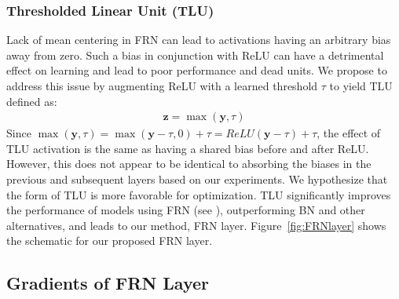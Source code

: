 \documentclass[10pt,twocolumn,letterpaper]{article}
\newcommand{\orelu}{TLU}
\newcommand{\relu}{ReLU}
\newcommand{\papername}{FRN}
\newcommand{\batchnorm}{BN}
\newcommand{\momentnorm}{FRN}
\begin{document}
\subsubsection{Thresholded Linear Unit (\orelu{})}
\label{sec:offsetrelu}

Lack of mean centering in FRN can lead to activations having an arbitrary bias away from zero. Such a bias in conjunction with ReLU can have a detrimental effect on learning and lead to poor performance and dead units. We propose to address this issue by augmenting ReLU with a learned threshold $\tau$ to yield \orelu{} defined as:
\begin{align}
\label{eq:offsetrelu}
\bm{z} = \max(\bm{y}, \tau)
\end{align}
Since $\max(\bm{y}, \tau){=}\max(\bm{y}-\tau,0){+}\tau{=}\relu{(\bm{y}{-}\tau)}{+}\tau$, the effect of \orelu{} activation is the same as having a shared bias before and after \relu{}. However, this does not appear to be identical to absorbing the biases in the previous and subsequent layers based on our experiments. We hypothesize that the form of \orelu{} is more favorable for optimization. \orelu{} significantly improves the performance of models using \momentnorm{} (see ), outperforming \batchnorm{} and other alternatives, and leads to our method, \papername{} layer. Figure~\ref{fig:FRNlayer} shows the schematic for our proposed \papername{} layer.


\subsection{Gradients of \papername{} Layer}
\label{sec:gradients}
\end{document}
